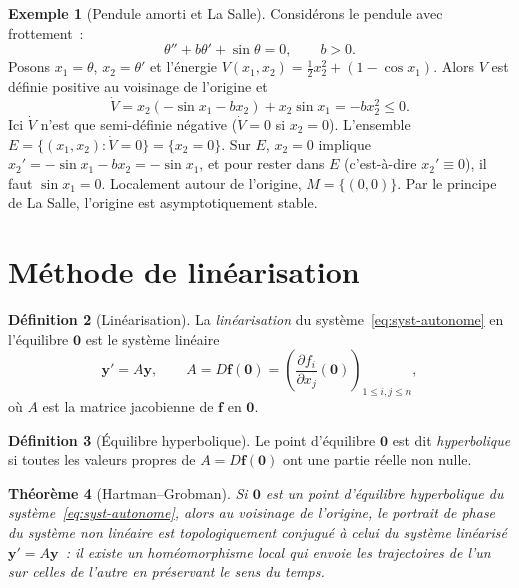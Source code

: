 \documentclass[12pt,a4paper,openany]{book}
\theoremstyle{definition}
\newtheorem{definition}{Définition}[chapter]
\newtheorem{exemple}[definition]{Exemple}
\theoremstyle{plain}
\newtheorem{theoreme}[definition]{Théorème}
\theoremstyle{remark}
\begin{document}
\begin{exemple}[Pendule amorti et La Salle]\label{ex:pendule-amorti}
  Considérons le pendule avec frottement~:
  \[
    \theta''+b\theta'+\sin\theta=0, \qquad b>0.
  \]
  Posons $x_1=\theta$, $x_2=\theta'$ et l'énergie
  $V(x_1,x_2)=\frac{1}{2}x_2^2+(1-\cos x_1)$.
  Alors $V$ est définie positive au voisinage de l'origine et
  \[
    \dot{V}=x_2(-\sin x_1-bx_2)+x_2\sin x_1=-bx_2^2\leq 0.
  \]
  Ici $\dot{V}$ n'est que semi-définie négative ($\dot{V}=0$ si
  $x_2=0$). L'ensemble $E=\{(x_1,x_2):\dot{V}=0\}=\{x_2=0\}$.
  Sur $E$, $x_2=0$ implique $x_2'=-\sin x_1-bx_2=-\sin x_1$, et
  pour rester dans $E$ (c'est-à-dire $x_2'\equiv 0$), il faut
  $\sin x_1=0$. Localement autour de l'origine, $M=\{(0,0)\}$.
  Par le principe de La Salle, l'origine est asymptotiquement stable.
\end{exemple}

\section{Méthode de linéarisation}\label{sec:linearisation}

\begin{definition}[Linéarisation]\label{def:linearisation}
  La \emph{linéarisation} du système~\eqref{eq:syst-autonome} en
  l'équilibre $\mathbf{0}$ est le système linéaire
  \[
    \mathbf{y}'=A\mathbf{y},
    \qquad A=D\mathbf{f}(\mathbf{0})
    = \left(\frac{\partial f_i}{\partial x_j}(\mathbf{0})\right)_{1\leq i,j\leq n},
  \]
  où $A$ est la matrice jacobienne de $\mathbf{f}$ en $\mathbf{0}$.
\end{definition}

\begin{definition}[Équilibre hyperbolique]\label{def:hyperbolique}
  Le point d'équilibre $\mathbf{0}$ est dit \emph{hyperbolique} si
  toutes les valeurs propres de $A=D\mathbf{f}(\mathbf{0})$ ont une
  partie réelle non nulle.
\end{definition}

\begin{theoreme}[Hartman--Grobman]\label{thm:hartman-grobman}
  Si $\mathbf{0}$ est un point d'équilibre \emph{hyperbolique} du
  système~\eqref{eq:syst-autonome}, alors au voisinage de l'origine,
  le portrait de phase du système non linéaire est
  \emph{topologiquement conjugué} à celui du système linéarisé
  $\mathbf{y}'=A\mathbf{y}$~: il existe un homéomorphisme local qui
  envoie les trajectoires de l'un sur celles de l'autre en préservant
  le sens du temps.
\end{theoreme}
\end{document}
